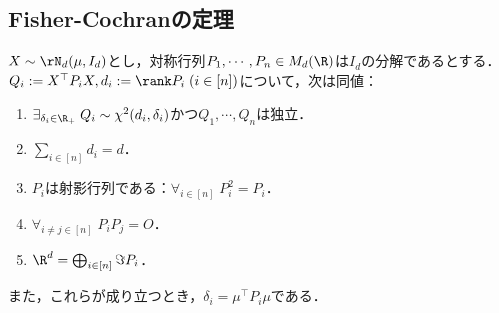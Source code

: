 \documentclass[uplatex,dvipdfmx]{jsreport}
\begin{document}
\subsection{Fisher-Cochranの定理}

\begin{theorem}
    $X\sim\rN_d(\mu,I_d)$とし，対称行列$P_1,\cdots,P_n\in M_d(\R)$は$I_d$の分解であるとする．
    $Q_i:=X^\top P_iX,d_i:=\rank P_i\;(i\in[n])$について，次は同値：
    \begin{enumerate}
        \item $\exists_{\delta_i\in\R_+}\;Q_i\sim\chi^2(d_i,\delta_i)$かつ$Q_1,\cdots,Q_n$は独立．
        \item $\sum_{i\in[n]}d_i=d$．
        \item $P_i$は射影行列である：$\forall_{i\in[n]}\;P_i^2=P_i$．
        \item $\forall_{i\ne j\in[n]}\;P_iP_j=O$．
        \item $\R^d=\bigoplus_{i\in[n]}\Im P_i$．
    \end{enumerate}
    また，これらが成り立つとき，$\delta_i=\mu^\top P_i\mu$である．
\end{theorem}
\end{document}
